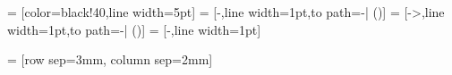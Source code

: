  = [color=black!40,line width=5pt]
 = [-,line width=1pt,to path={-| (\tikztotarget)}]
 = [->,line width=1pt,to path={-| (\tikztotarget)}]
 = [-,line width=1pt]


 = [row sep=3mm, column sep=2mm]



\newcommand{\MultilineComponent}[2]
{
	\begin{minipage}{#1}
	\begin{center}
		#2
	\end{center}
	\end{minipage}
}

\newcommand{\TwolineComponent}[3]
{
	\begin{minipage}{#1}
	\begin{center}
		#2 \linebreak #3
	\end{center}
	\end{minipage}
}

\newcommand{\ThreelineComponent}[4]
{
	\begin{minipage}{#1}
	\begin{center}
		#2 \linebreak #3 \linebreak #4
	\end{center}
	\end{minipage}
}

\newcommand{\MultiColumnComponent}[5]
{
	\begin{minipage}{#1}
	\begin{center}
	#2 \linebreak #3
	\end{center}
	\begin{minipage}{0.49\textwidth}
	\begin{center}
	#4
	\end{center}
	\end{minipage}
	\begin{minipage}{0.49\textwidth}
	\begin{center}
	#5
	\end{center}
	\end{minipage}
	\end{minipage}
}

\def\arraystretch{1.3}